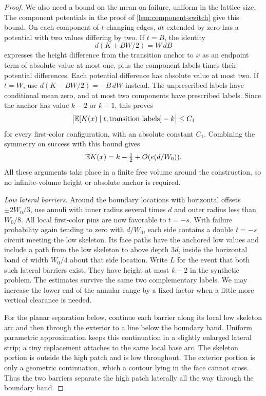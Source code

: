 \begin{proof}
We also need a bound on the mean on failure, uniform in the lattice size.
The component potentials in the proof of \cref{lem:component-switch}
give this bound.  On each component of $t$-changing edges, $dt$ extended
by zero has a potential with two values differing by two.  If $t=B$, the
identity
\[
                 d(K+BW/2)=W\,dB
\]
expresses the height difference from the transition anchor to $x$ as an
endpoint term of absolute value at most one, plus the component labels
times their potential differences.  Each potential difference has absolute
value at most two.  If $t=W$, use $d(K-BW/2)=-B\,dW$ instead.
The unprescribed labels have conditional mean zero, and at most two
components have prescribed labels.  Since the anchor has value $k-2$ or
$k-1$, this proves
\begin{equation}\label{eq:attachment-failure-mean}
       \bigl|\mathbb E[K(x)\mid t,\text{transition labels}]-k\bigr|\le C_1
\end{equation}
for every first-color configuration, with an absolute constant $C_1$.
Combining the symmetry on success with this bound gives
\begin{equation}\label{eq:attachment-synthetic-mean}
                  \mathbb E K(x)=k-\tfrac12+O(e(d/W_0)).
\end{equation}
All these arguments take place in a finite free volume around the
construction, so no infinite-volume height or absolute anchor is required.

\emph{Low lateral barriers.}
Around the boundary locations with horizontal offsets $\pm2W_0/3$, use
annuli with inner radius several times $d$ and outer radius less than
$W_0/8$.  All local first-color pins are now favorable to $t=-s$.  With
failure probability again tending to zero with $d/W_0$, each side contains
a double $t=-s$ circuit meeting the low skeleton.  Its face paths have the
anchored low values and include a path from the low skeleton to above
depth $3d$, inside the horizontal band of width $W_0/4$ about that side
location.  Write $L$ for the event that both such lateral barriers exist.
They have height at most $k-2$ in the synthetic problem.
The estimates survive the same two complementary labels.  We may increase
the lower end of the annular range by a fixed factor when a little more
vertical clearance is needed.

For the planar separation below, continue each barrier along its local low
skeleton arc and then through the exterior to a line below the boundary
band.  Uniform parametric approximation keeps this continuation in a
slightly enlarged lateral strip; a tiny replacement attaches to the same
local base arc.  The skeleton portion is outside the high patch and is
low throughout.  The exterior portion is only a geometric continuation,
which a contour lying in the face cannot cross.  Thus the two barriers
separate the high patch laterally all the way through the boundary band.


\end{proof}
